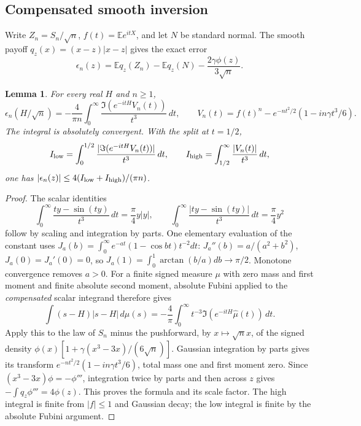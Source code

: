 \documentclass[11pt,a4paper]{article}
\numberwithin{equation}{section}
\newtheorem{lemma}[theorem]{Lemma}
\theoremstyle{definition}
\theoremstyle{remark}
\newcommand{\E}{\mathbb E}
\begin{document}
\subsection{Compensated smooth inversion}
Write $Z_n=S_n/\sqrt n$, $f(t)=\E e^{itX}$, and let $N$ be standard normal.
The smooth payoff $q_z(x)=(x-z)|x-z|$ gives the exact error
\[
 \epsilon_n(z)=\E q_z(Z_n)-\E q_z(N)-\frac{2\gamma\phi(z)}{3\sqrt n}.
\]
\begin{lemma}\label{cut49:smooth:fourier}\label{cut49:smooth:inversion}
For every real $H$ and $n\ge1$,
\begin{equation}\label{cut49:smooth:smooth-integral}
 \epsilon_n(H/\sqrt n)=-\frac4{\pi n}\int_0^\infty
 \frac{\Im(e^{-itH}V_n(t))}{t^3}\,dt,\qquad
 V_n(t)=f(t)^n-e^{-nt^2/2}(1-in\gamma t^3/6).
\end{equation}
The integral is absolutely convergent. With the split at $t=1/2$,
\begin{equation}\label{cut49:smooth:split}
 I_{\rm low}=\int_0^{1/2}\frac{|\Im(e^{-itH}V_n(t))|}{t^3}\,dt,
 \qquad I_{\rm high}=\int_{1/2}^\infty\frac{|V_n(t)|}{t^3}\,dt,
\end{equation}
one has $|\epsilon_n(z)|\le4(I_{\rm low}+I_{\rm high})/(\pi n)$.
\end{lemma}
\begin{proof}
The scalar identities
\[
 \int_0^\infty\frac{ty-\sin(ty)}{t^3}\,dt=\frac\pi4y|y|,
 \qquad
 \int_0^\infty\frac{|ty-\sin(ty)|}{t^3}\,dt=\frac\pi4y^2
\]
follow by scaling and integration by parts. One elementary evaluation of
the constant uses
$J_a(b)=\int_0^\infty e^{-at}(1-\cos bt)t^{-2}dt$:
$J_a''(b)=a/(a^2+b^2)$, $J_a(0)=J_a'(0)=0$, so
$J_a(1)=\int_0^1\arctan(b/a)db\to\pi/2$.
Monotone convergence removes $a>0$.
For a finite signed measure $\mu$ with zero mass and first moment and
finite absolute second moment, absolute Fubini applied to the
\emph{compensated} scalar integrand therefore gives
\begin{equation}\label{cut49:smooth:signed-inversion}
 \int (s-H)|s-H|\,d\mu(s)
 =-\frac4\pi\int_0^\infty t^{-3}
       \Im(e^{-itH}\widehat\mu(t))\,dt.
\end{equation}
Apply this to the law of $S_n$ minus the pushforward, by $x\mapsto\sqrt n x$,
of the signed density
$\phi(x)[1+\gamma(x^3-3x)/(6\sqrt n)]$.
Gaussian integration by parts gives its transform
$e^{-nt^2/2}(1-in\gamma t^3/6)$, total mass one and first moment zero.
Since $(x^3-3x)\phi=-\phi'''$, integration twice by parts and then across
$z$ gives $-\int q_z\phi'''=4\phi(z)$. This proves the formula and its
scale factor. The high integral is finite from $|f|\le1$ and Gaussian
decay; the low integral is finite by the absolute Fubini argument.
\end{proof}
\end{document}

